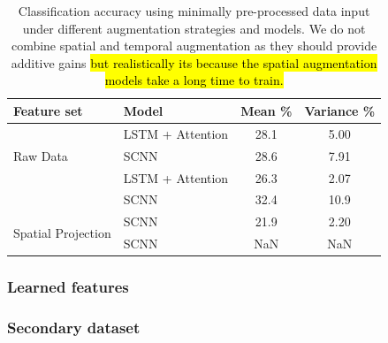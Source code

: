 \documentclass[utf8]{frontiersSCNS} %
\begin{document}
\begin{table}[t]
  \centering
  \label{tab:end2end_results}
  \begin{tabular}{l l | c | c}
    \toprule
    \textbf{Feature set} & \textbf{Model} & \textbf{Mean \%} & \textbf{Variance \%} \\
    \toprule
    \multirow{3}{*}{Raw Data}
                         & LSTM + Attention    & 28.1 & 5.00  \\ 
                         & SCNN                & 28.6 & 7.91  \\
    \midrule
    \multirow{3}{*}{Temporal Augmentation}
                         & LSTM + Attention    & 26.3 & 2.07  \\ 
                         & SCNN                & 32.4 & 10.9  \\
    \midrule
    \multirow{3}{*}{Spatial Projection}
                         & SCNN                & 21.9 & 2.20  \\
    \midrule
    \multirow{3}{*}{Spatial Augmentation}
                         & SCNN                & NaN & NaN  \\
    
    \bottomrule
  \end{tabular}
  \caption{Classification accuracy using minimally pre-processed data input under different augmentation strategies and models. We do not combine spatial and temporal augmentation as they should provide additive gains \hl{but realistically its because the spatial augmentation models take a long time to train.}}
\end{table}

\subsubsection{Learned features}

\subsubsection{Secondary dataset}
\end{document}
